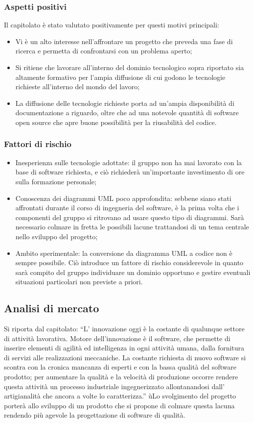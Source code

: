 \documentclass[../StudioDiFattibilita.tex]{subfiles}
\begin{document}
			\subsubsection{Aspetti positivi}
			Il capitolato è stato valutato positivamente per questi motivi principali:
			\begin{itemize}
				\item Vi è un alto interesse nell'affrontare un progetto che preveda una fase di ricerca e permetta di
				confrontarsi con un problema aperto;
				\item Si ritiene che lavorare all'interno del dominio tecnologico sopra riportato sia altamente formativo per
				l'ampia diffusione di cui godono le tecnologie richieste all'interno del mondo del lavoro;
				\item La diffusione delle tecnologie richieste porta ad un'ampia disponibilità di documentazione a riguardo, oltre
				che ad una notevole quantità di software open source che apre buone possibilità per la riusabilità del codice.
			\end{itemize}
			\subsubsection{Fattori di rischio}
			\begin{itemize}
				\item Inesperienza sulle tecnologie adottate: il gruppo non ha mai lavorato con la base di software richiesta, e
				ciò richiederà un’importante investimento di ore sulla formazione personale;
				\item Conoscenza dei diagrammi UML poco approfondita: sebbene siano stati affrontati durante il corso di
				ingegneria del software, è la prima volta che i componenti del gruppo si ritrovano ad usare questo tipo di
				diagrammi. Sarà necessario colmare in fretta le possibili lacune trattandosi di un tema centrale nello sviluppo
				del progetto;
				\item Ambito sperimentale: la conversione da diagramma UML a codice non è sempre possibile. Ciò introduce
				un fattore di rischio considerevole in quanto sarà compito del gruppo individuare un dominio opportuno e
				gestire eventuali situazioni particolari non previste a priori.
			\end{itemize}
		\subsection{Analisi di mercato}
		Si riporta dal capitolato:
		“L’ innovazione oggi è la costante di qualunque settore di attività lavorativa. Motore dell’innovazione è il software, che
		permette di inserire elementi di agilità ed intelligenza in ogni attività umana, dalla fornitura di servizi alle realizzazioni
		meccaniche. La costante richiesta di nuovo software si scontra con la cronica mancanza di esperti e con la bassa qualità del
		software prodotto; per aumentare la qualità e la velocità di produzione occorre rendere questa attività un processo
		industriale ingegnerizzato allontanandosi dall’ artigianalità che ancora a volte lo caratterizza.”
		ùLo svolgimento del progetto porterà allo sviluppo di un prodotto che si propone di colmare questa lacuna rendendo più
		agevole la progettazione di software di qualità.
\end{document}
